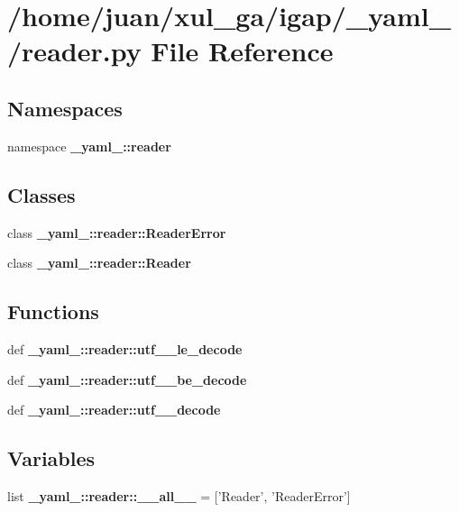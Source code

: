 \section{/home/juan/xul\_\-ga/igap/\_\-yaml\_\-/reader.py File Reference}
\label{reader_8py}
\subsection*{Namespaces}
\begin{CompactItemize}
\item 
namespace {\bf \_\-yaml\_\-::reader}
\end{CompactItemize}
\subsection*{Classes}
\begin{CompactItemize}
\item 
class {\bf \_\-yaml\_\-::reader::ReaderError}
\item 
class {\bf \_\-yaml\_\-::reader::Reader}
\end{CompactItemize}
\subsection*{Functions}
\begin{CompactItemize}
\item 
def {\bf \_\-yaml\_\-::reader::utf\_\_\-le\_\-decode}
\item 
def {\bf \_\-yaml\_\-::reader::utf\_\_\-be\_\-decode}
\item 
def {\bf \_\-yaml\_\-::reader::utf\_\_\-decode}
\end{CompactItemize}
\subsection*{Variables}
\begin{CompactItemize}
\item 
list {\bf \_\-yaml\_\-::reader::\_\-\_\-all\_\-\_\-} = ['Reader', 'ReaderError']
\end{CompactItemize}
